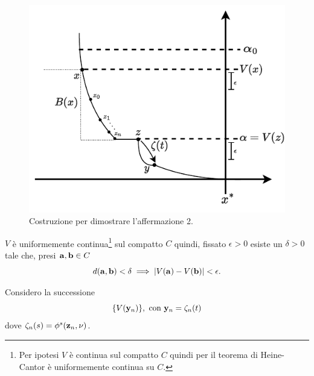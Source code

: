 \begin{steps}
    \hfill
    \begin{minipage}{.8\textwidth}
        \begin{figure}[H]
            \centering
            \includegraphics[width=.7\textwidth]{assets/ljapunov-dim-aff2}
            \caption[Costruzione 2 per teorema di Ljapunov]{Costruzione per dimostrare
            l'affermazione 2.}%
            \label{fig:ljapunov-dim-aff2}
        \end{figure}
    \end{minipage}

    $V$ è uniformemente continua\footnote{Per ipotesi
        $V$ è continua sul compatto $C$ quindi per il teorema di Heine-Cantor è
        uniformemente continua su $C$.} sul compatto $C$ quindi, fissato $\epsilon >0$ esiste un $\delta > 0$
    tale che, presi $\mathbf{a}, \mathbf{b} \in C$
    \begin{equation}
        d(\mathbf{a}, \mathbf{b}) < \delta \implies |V(\mathbf{a}) - V(\mathbf{b})| < \epsilon.
        \label{eq:v-uniformemente-continua}
    \end{equation}

    Considero la successione
    \begin{equation*}
        \{V(\mathbf{y}_n)\}, \text{ con } \mathbf{y}_n = \zeta_n(t)
    \end{equation*}
    dove $\zeta_n(s) = \phi^s(\mathbf{z}_n, \nu)$.


\end{steps}
